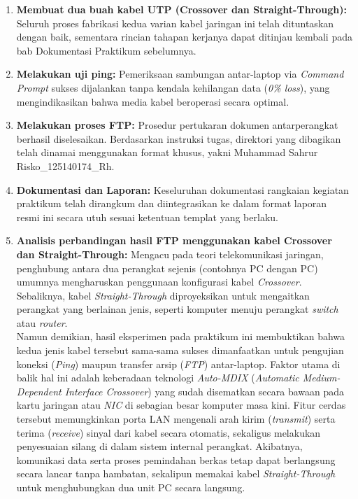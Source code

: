 \begin{enumerate}[leftmargin=*, itemsep=1em, parsep=0pt]
  \item \textbf{Membuat dua buah kabel UTP (Crossover dan Straight-Through):} Seluruh proses fabrikasi kedua varian kabel jaringan ini telah dituntaskan dengan baik, sementara rincian tahapan kerjanya dapat ditinjau kembali pada bab Dokumentasi Praktikum sebelumnya.
  \item \textbf{Melakukan uji ping:} Pemeriksaan sambungan antar-laptop via \textit{Command Prompt} sukses dijalankan tanpa kendala kehilangan data (\textit{0\% loss}), yang mengindikasikan bahwa media kabel beroperasi secara optimal.
  \item \textbf{Melakukan proses FTP:} Prosedur pertukaran dokumen antarperangkat berhasil diselesaikan. Berdasarkan instruksi tugas, direktori yang dibagikan telah dinamai menggunakan format khusus, yakni Muhammad Sahrur Risko\_125140174\_Rh.
  \item \textbf{Dokumentasi dan Laporan:} Keseluruhan dokumentasi rangkaian kegiatan praktikum telah dirangkum dan diintegrasikan ke dalam format laporan resmi ini secara utuh sesuai ketentuan templat yang berlaku.
  \item \textbf{Analisis perbandingan hasil FTP menggunakan kabel Crossover dan Straight-Through:} Mengacu pada teori telekomunikasi jaringan, penghubung antara dua perangkat sejenis (contohnya PC dengan PC) umumnya mengharuskan penggunaan konfigurasi kabel \textit{Crossover}. Sebaliknya, kabel \textit{Straight-Through} diproyeksikan untuk mengaitkan perangkat yang berlainan jenis, seperti komputer menuju perangkat \textit{switch} atau \textit{router}.\\[1em]

  Namun demikian, hasil eksperimen pada praktikum ini membuktikan bahwa kedua jenis kabel tersebut sama-sama sukses dimanfaatkan untuk pengujian koneksi (\textit{Ping}) maupun transfer arsip (\textit{FTP}) antar-laptop. Faktor utama di balik hal ini adalah keberadaan teknologi \textit{Auto-MDIX} (\textit{Automatic Medium-Dependent Interface Crossover}) yang sudah disematkan secara bawaan pada kartu jaringan atau \textit{NIC} di sebagian besar komputer masa kini. Fitur cerdas tersebut memungkinkan porta LAN mengenali arah kirim (\textit{transmit}) serta terima (\textit{receive}) sinyal dari kabel secara otomatis, sekaligus melakukan penyesuaian silang di dalam sistem internal perangkat. Akibatnya, komunikasi data serta proses pemindahan berkas tetap dapat berlangsung secara lancar tanpa hambatan, sekalipun memakai kabel \textit{Straight-Through} untuk menghubungkan dua unit PC secara langsung.
\end{enumerate}

